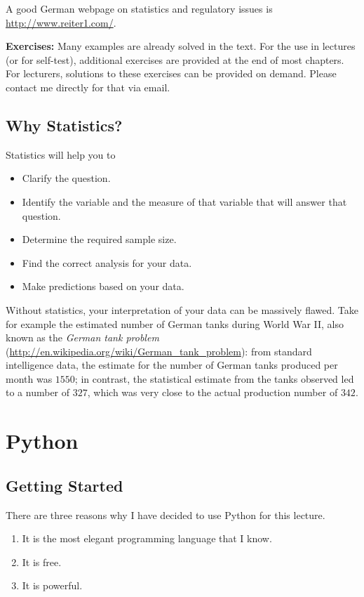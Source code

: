  A good German webpage on statistics and regulatory issues is \url{http://www.reiter1.com/}.

\vspace{5 mm}

\textbf{Exercises: }Many examples are already solved in the text. For the use in lectures (or for self-test), additional exercises are provided at the end of most chapters. For lecturers, solutions to these exercises can be provided on demand. Please contact me directly for that via email.

\section{Why Statistics?}

Statistics will help you to
\begin{itemize}
  \item Clarify the question.
  \item Identify the variable and the measure of that variable that will answer that question.
  \item Determine the required sample size.
  \item Find the correct analysis for your data.
  \item Make predictions based on your data.
\end{itemize}

Without statistics, your interpretation of your data can be massively flawed. Take for example the estimated number of German tanks during World War II, also known as the \emph{German tank problem} (\url{http://en.wikipedia.org/wiki/German_tank_problem}): from standard intelligence data, the estimate for the number of German tanks produced per month was $1550$; in contrast, the statistical estimate from the tanks observed led to a number of $327$, which was very close to the actual production number of $342$.

\chapter{Python}

\section{Getting Started}

There are three reasons why I have decided to use Python for this lecture.

\begin{enumerate}
  \item It is the most elegant programming language that I know.
  \item It is free.
  \item It is powerful.
\end{enumerate}


